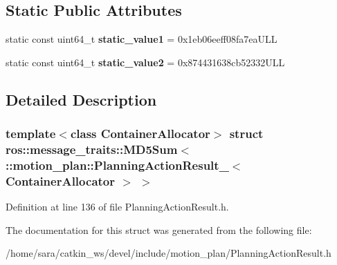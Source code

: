 \subsection*{Static Public Attributes}
\begin{DoxyCompactItemize}
\item 
\mbox{\label{structros_1_1message__traits_1_1MD5Sum_3_01_1_1motion__plan_1_1PlanningActionResult___3_01ContainerAllocator_01_4_01_4_a5b0a45d3998e38c5e12f030d4864154f}} 
static const uint64\+\_\+t {\bfseries static\+\_\+value1} = 0x1eb06eeff08fa7ea\+U\+LL
\item 
\mbox{\label{structros_1_1message__traits_1_1MD5Sum_3_01_1_1motion__plan_1_1PlanningActionResult___3_01ContainerAllocator_01_4_01_4_ae2315c67d21d0ae39bd00176fd101829}} 
static const uint64\+\_\+t {\bfseries static\+\_\+value2} = 0x874431638cb52332\+U\+LL
\end{DoxyCompactItemize}


\subsection{Detailed Description}
\subsubsection*{template$<$class Container\+Allocator$>$\newline
struct ros\+::message\+\_\+traits\+::\+M\+D5\+Sum$<$ \+::motion\+\_\+plan\+::\+Planning\+Action\+Result\+\_\+$<$ Container\+Allocator $>$ $>$}



Definition at line 136 of file Planning\+Action\+Result.\+h.



The documentation for this struct was generated from the following file\+:\begin{DoxyCompactItemize}
\item 
/home/sara/catkin\+\_\+ws/devel/include/motion\+\_\+plan/Planning\+Action\+Result.\+h\end{DoxyCompactItemize}
